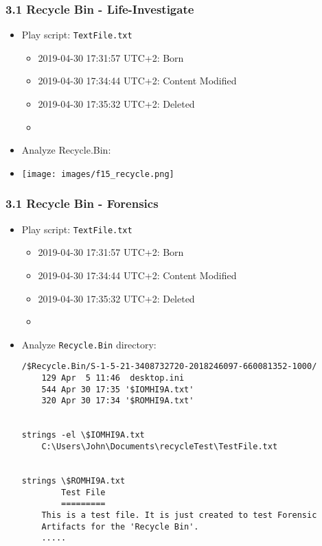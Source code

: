 \begin{frame}[fragile]
  \frametitle{3.1 Recycle Bin - Life-Investigate}
    \begin{itemize}
        \item Play script: \texttt{TextFile.txt} 
            \begin{itemize}
		\item 2019-04-30 17:31:57 UTC+2:  Born
		\item 2019-04-30 17:34:44 UTC+2:  Content Modified
		\item 2019-04-30 17:35:32 UTC+2:  Deleted
		\item[]
            \end{itemize}
        \item Analyze Recycle.Bin:
        \item[] \texttt{[image: images/f15\_recycle.png]}
    \end{itemize}
\end{frame}


\begin{frame}[fragile]
  \frametitle{3.1 Recycle Bin - Forensics}
    \begin{itemize}
        \item Play script: \texttt{TextFile.txt} 
            \begin{itemize}
		\item 2019-04-30 17:31:57 UTC+2:  Born
		\item 2019-04-30 17:34:44 UTC+2:  Content Modified
		\item 2019-04-30 17:35:32 UTC+2:  Deleted
		\item[]
            \end{itemize}
        \item Analyze \texttt{Recycle.Bin} directory:
  \begin{lstlisting}[basicstyle=\tiny]
/$Recycle.Bin/S-1-5-21-3408732720-2018246097-660081352-1000/
	129 Apr  5 11:46  desktop.ini
	544 Apr 30 17:35 '$IOMHI9A.txt'
	320 Apr 30 17:34 '$ROMHI9A.txt'


strings -el \$IOMHI9A.txt 
	C:\Users\John\Documents\recycleTest\TestFile.txt


strings \$ROMHI9A.txt 
		Test File
		=========
	This is a test file. It is just created to test Forensic
	Artifacts for the 'Recycle Bin'.
	.....
  \end{lstlisting}
    \end{itemize}
\end{frame}


